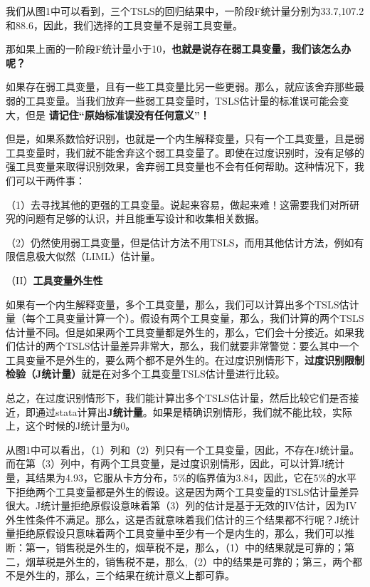 \documentclass[cn,12pt,math=newtx,citestyle=gb7714-2015,bibstyle=gb7714-2015]{elegantbook}
\begin{document}
	我们从图1中可以看到，三个TSLS的回归结果中，一阶段F统计量分别为33.7,107.2和88.6，因此，我们选择的工具变量不是弱工具变量。
	
	那如果上面的一阶段F统计量小于10，\textbf{也就是说存在弱工具变量，我们该怎么办呢？}
	
	如果存在弱工具变量，且有一些工具变量比另一些更弱。那么，就应该舍弃那些最弱的工具变量。当我们放弃一些弱工具变量时，TSLS估计量的标准误可能会变大，但是       \textbf{请记住“原始标准误没有任何意义”！}
	
	但是，如果系数恰好识别，也就是一个内生解释变量，只有一个工具变量，且是弱工具变量时，我们就不能舍弃这个弱工具变量了。即使在过度识别时，没有足够的强工具变量来取得识别效果，舍弃弱工具变量也不会有任何帮助。这种情况下，我们可以干两件事：
	
	（1）去寻找其他的更强的工具变量。说起来容易，做起来难！这需要我们对所研究的问题有足够的认识，并且能重写设计和收集相关数据。
	
	（2）仍然使用弱工具变量，但是估计方法不用TSLS，而用其他估计方法，例如有限信息极大似然（LIML）估计量。
	
	（II）\textbf{工具变量外生性}
	
	如果有一个内生解释变量，多个工具变量，那么，我们可以计算出多个TSLS估计量（每个工具变量计算一个）。假设有两个工具变量，那么，我们计算的两个TSLS估计量不同。但是如果两个工具变量都是外生的，那么，它们会十分接近。如果我们估计的两个TSLS估计量差异非常大，那么，我们就要非常警觉：要么其中一个工具变量不是外生的，要么两个都不是外生的。在过度识别情形下，\textbf{过度识别限制检验（J统计量）}就是在对多个工具变量TSLS估计量进行比较。
	
	总之，在过度识别情形下，我们能计算出多个TSLS估计量，然后比较它们是否接近，即通过stata计算出\textbf{J统计量}。如果是精确识别情形，我们就不能比较，实际上，这个时候的J统计量为0。
	
	从图1中可以看出，（1）列和（2）列只有一个工具变量，因此，不存在J统计量。而在第（3）列中，有两个工具变量，是过度识别情形，因此，可以计算J统计量，其结果为4.93，它服从卡方分布，5\%的临界值为3.84，因此，它在5\%的水平下拒绝两个工具变量都是外生的假设。这是因为两个工具变量的TSLS估计量差异很大。J统计量拒绝原假设意味着第（3）列的估计是基于无效的IV估计，因为IV外生性条件不满足。那么，这是否就意味着我们估计的三个结果都不行呢？J统计量拒绝原假设只意味着两个工具变量中至少有一个是内生的，那么，我们可以推断：第一，销售税是外生的，烟草税不是，那么，（1）中的结果就是可靠的；第二，烟草税是外生的，销售税不是，那么,（2）中的结果是可靠的；第三，两个都不是外生的，那么，三个结果在统计意义上都可靠。
	
\end{document}
